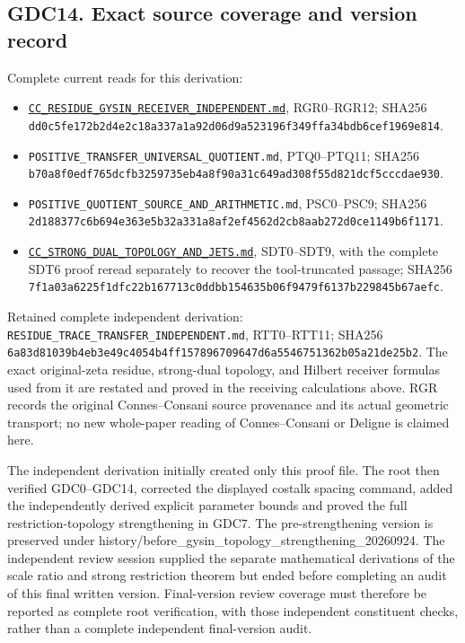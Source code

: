 \subsection{GDC14. Exact source coverage and version
record}\label{gdc14.-exact-source-coverage-and-version-record}

Complete current reads for this derivation:

\begin{itemize}
\tightlist
\item
  \href{https://github.com/KokunoYumeto/zeta-function-research-reader/blob/main/workbenches/splitzero-tandem/continuations/20260924-cohomology-weight-and-character-lifts/gct-weight-control/proofs/CC_RESIDUE_GYSIN_RECEIVER_INDEPENDENT.md}{\nolinkurl{CC_RESIDUE_GYSIN_RECEIVER_INDEPENDENT.md}},
  RGR0--RGR12; SHA256
  \nolinkurl{dd0c5fe172b2d4e2c18a337a1a92d06d9a523196f349ffa34bdb6cef1969e814}.
\item
  \nolinkurl{POSITIVE_TRANSFER_UNIVERSAL_QUOTIENT.md}, PTQ0--PTQ11;
  SHA256
  \nolinkurl{b70a8f0edf765dcfb3259735eb4a8f90a31c649ad308f55d821dcf5cccdae930}.
\item
  \nolinkurl{POSITIVE_QUOTIENT_SOURCE_AND_ARITHMETIC.md}, PSC0--PSC9;
  SHA256
  \nolinkurl{2d188377c6b694e363e5b32a331a8af2ef4562d2cb8aab272d0ce1149b6f1171}.
\item
  \href{https://github.com/KokunoYumeto/zeta-function-research-reader/blob/main/workbenches/splitzero-tandem/continuations/20260924-cohomology-weight-and-character-lifts/gct-weight-control/proofs/CC_STRONG_DUAL_TOPOLOGY_AND_JETS.md}{\nolinkurl{CC_STRONG_DUAL_TOPOLOGY_AND_JETS.md}},
  SDT0--SDT9, with the complete SDT6 proof reread separately to recover
  the tool-truncated passage; SHA256
  \nolinkurl{7f1a03a6225f1dfc22b167713c0ddbb154635b06f9479f6137b229845b67aefc}.
\end{itemize}

Retained complete independent derivation:
\nolinkurl{RESIDUE_TRACE_TRANSFER_INDEPENDENT.md}, RTT0--RTT11; SHA256
\nolinkurl{6a83d81039b4eb3e49c4054b4ff157896709647d6a5546751362b05a21de25b2}.
The exact original-zeta residue, strong-dual topology, and Hilbert
receiver formulas used from it are restated and proved in the receiving
calculations above. RGR records the original Connes--Consani source
provenance and its actual geometric transport; no new whole-paper
reading of Connes--Consani or Deligne is claimed here.

The independent derivation initially created only this proof file. The
root then verified GDC0--GDC14, corrected the displayed costalk spacing
command, added the independently derived explicit parameter bounds and
proved the full restriction-topology strengthening in GDC7. The
pre-strengthening version is preserved under
history/before\_gysin\_topology\_strengthening\_20260924. The
independent review session supplied the separate mathematical
derivations of the scale ratio and strong restriction theorem but ended
before completing an audit of this final written version. Final-version
review coverage must therefore be reported as complete root
verification, with those independent constituent checks, rather than a
complete independent final-version audit.
